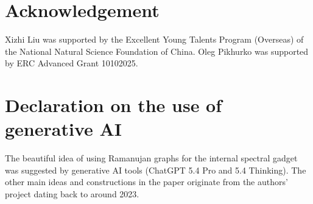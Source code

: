 \documentclass[10pt]{article}
\numberwithin{equation}{section}
\begin{document}
\section*{Acknowledgement}

Xizhi Liu was supported by the Excellent Young Talents Program (Overseas) of the National Natural Science Foundation of China. Oleg Pikhurko was supported by ERC Advanced Grant 10102025.

\section*{Declaration on the use of generative AI}

The beautiful idea of using Ramanujan graphs for the internal spectral gadget was suggested by generative AI tools (ChatGPT 5.4 Pro and 5.4 Thinking). The other main ideas and constructions in the paper originate from the authors' project dating back to around 2023.



\end{document}
